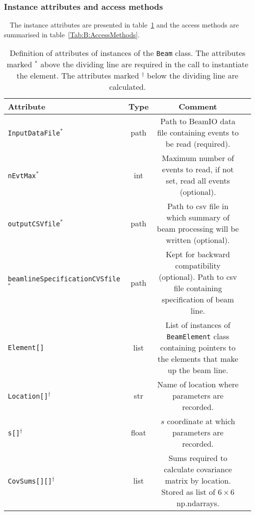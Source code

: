 \subsubsection{Instance attributes and access methods} ~\newline
\label{SubSubSect:BLE:InstAttr}
\noindent
The instance attributes are presented in table~\ref{Tab:B:Attributes}
and the access methods are summarised in table~\ref{Tab:B:AccessMethods}.
\begin{table}[h]
  \caption{
    Definition of attributes of instances of
    the \texttt{Beam} class.
    The attributes marked $^*$ above the dividing line are required in
    the call to instantiate the element.
    The attributes marked $^\dagger$ below the dividing line are
    calculated.
  }
  \label{Tab:B:Attributes}
  \begin{center}
    \begin{tabular}{|l|c|c|p{10cm}|}
      \hline
      \textbf{Attribute} & \textbf{Type} & \textbf{Comment}                                                                  \\
      \hline
      \texttt{InputDataFile}$^*$ & path & Path to BeamIO data file containing events to be read (required).                    \\
      \texttt{nEvtMax}$^*$       & int  & Maximum number of events to read, if not set, read all events (optional).            \\
      \texttt{outputCSVfile}$^*$ & path & Path to csv file in which summary of beam processing will be written (optional).     \\
 \texttt{beamlineSpecificationCVSfile}$^*$ &
                                   path & Kept for backward compatibility (optional).
                                          Path to csv file containing specification of beam line.                              \\
      \hline
      \texttt{Element[]}             & list  & List of instances of \texttt{BeamElement} class containing
                                                              pointers to the elements that make up the beam line.           \\
      \texttt{Location[]}$^{\dagger}$    & str   & Name of location where parameters are recorded.                             \\
      \texttt{s[]}$^{\dagger}$           & float & $s$ coordinate at which parameters are recorded.                            \\
      \texttt{CovSums[][]}$^{\dagger}$   & list  & Sums required to calculate covariance matrix by location.  Stored as list of $6\times6$ np.ndarrays.     \\

\end{tabular}
\end{center}
\end{table}
